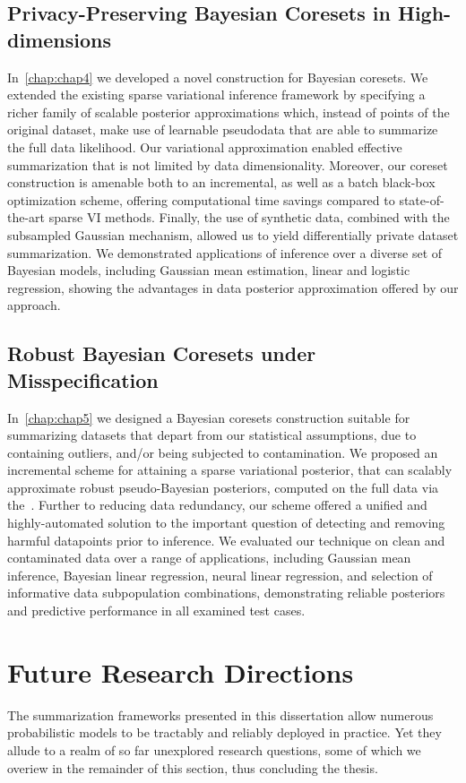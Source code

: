 \subsection{Privacy-Preserving Bayesian Coresets in High-dimensions}
\label{subsec:ch4-summary}
In~\cref{chap:chap4} we developed a novel construction for Bayesian coresets. We extended the existing sparse variational inference framework by specifying a richer family of scalable posterior approximations which, instead of points of the original dataset, make use of learnable pseudodata that are able to summarize the full data likelihood. Our variational approximation enabled effective summarization that is not limited by data dimensionality. Moreover, our coreset construction is amenable both to an incremental, as well as a batch black-box optimization scheme, offering computational time savings compared to state-of-the-art sparse VI methods. Finally, the use of synthetic data, combined with the subsampled Gaussian mechanism, allowed us to yield differentially private dataset summarization. We demonstrated applications of inference over a diverse set of Bayesian models, including Gaussian mean estimation, linear and logistic regression, showing the advantages in data posterior approximation offered by our approach.

\subsection{Robust Bayesian Coresets under Misspecification}
\label{subsec:ch4-summary}
In~\cref{chap:chap5} we designed a Bayesian coresets construction suitable for summarizing datasets that depart from our statistical assumptions, due to containing outliers, and/or being subjected to contamination. We proposed an incremental scheme for attaining a sparse variational posterior, that can scalably approximate robust pseudo-Bayesian posteriors, computed on the full data via the~\bdiv. Further to reducing data redundancy, our scheme offered a unified and highly-automated solution to the important question of detecting and removing harmful datapoints prior to inference. We evaluated our technique on clean and contaminated data over a range of applications, including Gaussian mean inference, Bayesian linear regression, neural linear regression, and selection of informative data subpopulation combinations, demonstrating reliable posteriors and predictive performance in all examined test cases.


\section{Future Research Directions}
\label{sec:future-research-directions}
The summarization frameworks presented in this dissertation allow numerous probabilistic models to be tractably and reliably deployed in practice. Yet they allude to a realm of so far unexplored research questions, some of which we overiew in the remainder of this section, thus concluding the thesis.

